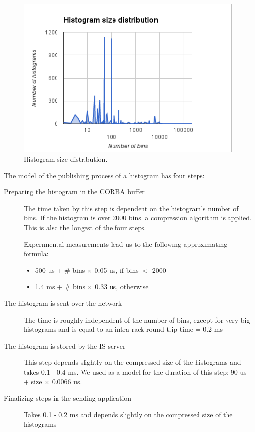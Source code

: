 \begin{figure}[ht]
\centering
\includegraphics[scale=0.6]{Images/histo_distrib.png}
\caption{Histogram size distribution.}
\label{fig:histosize}
\end{figure}


The model of the publishing process of a histogram has four steps: 
\begin{description}
\item [Preparing the histogram in the CORBA buffer]
The time taken by this step is dependent on the histogram's number of bins. If the histogram is over 2000 bins, a compression algorithm is applied. This is also the longest of the four steps.

Experimental measurements lead us to the following approximating formula:
\begin{itemize}
\item 500 us + \# bins $\times$ 0.05 us, if bins $<$ 2000
\item 1.4 ms + \# bins $\times$ 0.33 us, otherwise 
\end{itemize}
\item[The histogram is sent over the network]
The time is roughly independent of the number of bins, except for very big histograms and is equal to an intra-rack round-trip time = 0.2 ms
\item[The histogram is stored by the IS server]
This step depends slightly on the compressed size of the histograms and takes 0.1 - 0.4 ms. We used as a model for the duration of this step: 90 us + size $\times$ 0.0066 us.
\item[Finalizing steps in the sending application]
Takes 0.1 - 0.2 ms and depends slightly on the compressed size of the histograms.
\end{description}

